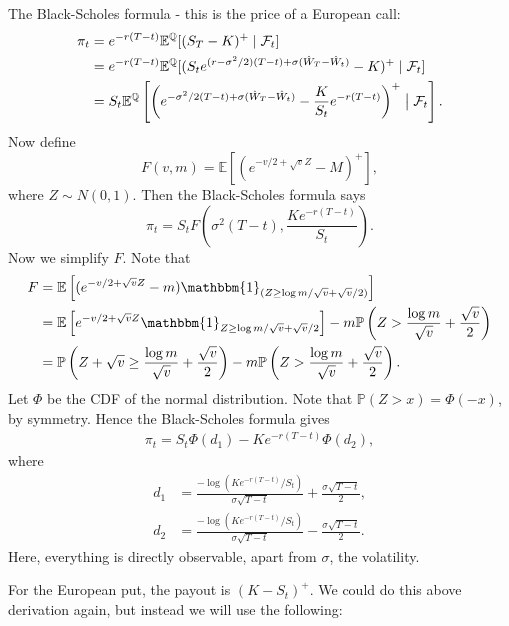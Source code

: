 \documentclass[12pt]{article}
\begin{document}
\begin{exbox}
	The Black-Scholes formula - this is the price of a European call:
	\begin{align*}
		\pi_t &= e^{-r(T-t)}\mathbb{E}^{\mathbb{Q}}[(S_T - K)^{+} \mid \mathcal{F}_t] \\
		      &= e^{-r(T - t)}\mathbb{E}^{\mathbb{Q}}[(S_t e^{(r - \sigma^2/2)(T - t) + \sigma(\hat W_T - \hat W_t)} - K)^{+} \mid \mathcal{F}_t] \\
		      &= S_t \mathbb{E}^{\mathbb{Q}}\left[\left(e^{-\sigma^2/2(T - t) + \sigma(\hat W_T - \hat W_t)} - \frac{K}{S_t} e^{-r(T - t)} \right)^{+} \bigm| \mathcal{F}_t\right].
	\end{align*}
	Now define
	\[
	F(v, m) = \mathbb{E}\left[(e^{-v/2 + \sqrt v Z} - M )^{+}\right],
	\]
	where $Z \sim N(0, 1)$. Then the Black-Scholes formula says
	\[
	\pi_t = S_t F\left( \sigma^2(T - t), \frac{K e^{-r(T - t)}}{S_t} \right).
	\]
	Now we simplify $F$. Note that
	\begin{align*}
		F &= \mathbb{E}\left[(e^{-v/2 + \sqrt v Z} - m ) \mathbbm{1}_{(Z \geq \log m/\sqrt v + \sqrt v /2)} \right] \\
		  &= \mathbb{E}\left[e^{-v/2 + \sqrt v Z} \mathbbm{1}_{Z \geq \log m / \sqrt v + \sqrt v / 2} \right] - m \mathbb{P}\left( Z > \frac{\log m}{\sqrt v} + \frac{\sqrt v}{2} \right) \\
		  &= \mathbb{P}\left( Z + \sqrt v \geq \frac{\log m}{\sqrt v} + \frac{\sqrt v}{2} \right) - m \mathbb{P} \left(Z > \frac{\log m}{\sqrt v} + \frac{\sqrt v}{2} \right).
	\end{align*}
	Let $\Phi$ be the CDF of the normal distribution. Note that $\mathbb{P}(Z > x) = \Phi(-x)$, by symmetry. Hence the Black-Scholes formula gives
	\begin{align*}
		\pi_t = S_t \Phi(d_1) - K e^{-r(T - t)} \Phi(d_2),
	\end{align*}
	where
	\begin{align*}
		d_1 &= \frac{- \log (Ke^{-r(T - t)}/S_t)}{\sigma \sqrt{T - t}} + \frac{\sigma \sqrt{T - t}}{2}, \\
		d_2 &= \frac{- \log (K e^{-r(T - t)}/S_t)}{\sigma \sqrt{T - t}} - \frac{\sigma \sqrt{T - t}}{2}.
	\end{align*}
	Here, everything is directly observable, apart from $\sigma$, the volatility.
\end{exbox}

For the European put, the payout is $(K - S_t)^{+}$. We could do this above derivation again, but instead we will use the following:
\end{document}

